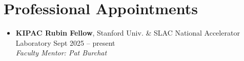 \section{Professional Appointments}

\begin{itemize}
    \item \textbf{KIPAC Rubin Fellow}, Stanford Univ. \& SLAC National Accelerator Laboratory
    \hfill Sept 2025 -- present \\
    \textit{Faculty Mentor: Pat Burchat}
\end{itemize}